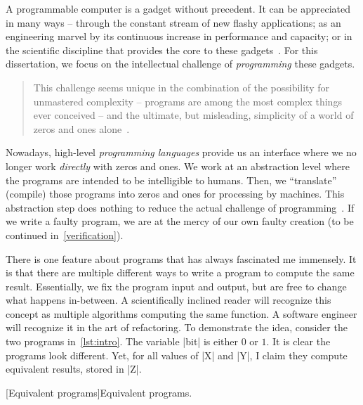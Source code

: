 A programmable computer is a gadget without precedent.
It can be appreciated in many ways --
through the constant stream of new flashy applications;
as an engineering marvel by its continuous increase in performance and capacity;
or in the scientific discipline that provides the core to these gadgets~\cite{dijkstra1979a,hoare2006}.
For this dissertation, we focus on the intellectual challenge of \emph{programming} these gadgets.
\begin{quotation}
\noindent This challenge seems unique in the combination of the possibility for unmastered complexity -- programs are among the most
complex things ever conceived -- and the ultimate, but misleading, simplicity of a world of zeros and ones alone~\cite{dijkstra1979a}.
\end{quotation}

Nowadays, high-level \emph{programming languages} provide us an interface where we no longer work \emph{directly} with zeros and ones.
We work at an abstraction level where the programs are intended to be intelligible to humans.
Then, we \enquote{translate} (compile) those programs into zeros and ones for processing by machines.
This abstraction step does nothing to reduce the actual challenge of programming~\cite{dijkstra1979b}.
If we write a faulty program, we are at the mercy of our own faulty creation (to be continued in~\autoref{verification}).

There is one feature about programs that has always fascinated me immensely.
It is that there are {multiple different ways} to write a program to compute the {same result}.
Essentially, we fix the program input and output, but are free to change what happens in-between.
A scientifically inclined reader will recognize this concept as multiple algorithms computing the same function.
A software engineer will recognize it in the art of refactoring.
To demonstrate the idea, consider the two programs in~\autoref{lst:intro}.
The variable \pr|bit| is either \(0\) or \(1\).
It is clear the programs look different.
Yet, for all values of \pr|X| and \pr|Y|, I claim they compute equivalent results, stored in \pr|Z|.

\begin{center}
\captionsetup{type=lstlisting}
\begin{minipage}{.3\textwidth}

\end{minipage}%
\hspace{3em}%
\begin{minipage}{.4\textwidth}
\captionsetup{type=lstlisting}

\end{minipage}
[Equivalent programs]{Equivalent programs.}
\label{lst:intro}
\end{center}

